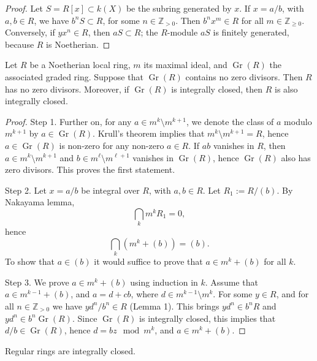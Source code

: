 \begin{proof}
Let $S=R[x]\subset k(X)$ be the subring
generated by $x$. If $x=a/b$, with
$a,b\in R$, we have $b^nS\subset R$, for
some $n\in\mathbb{Z}_{>0}$. Then
$b^nx^m\in R$ for all $m\in\mathbb{Z}_{\geq 0}$.
Conversely, if $yx^n\in R$, then
$aS\subset R$; the $R$-module $aS$ is
finitely generated, because $R$ is
Noetherian.
\end{proof}



\begin{proposition}
\label{proposition-regular-rings-integrally-closed}
Let $R$ be a Noetherian local ring, $m$
its maximal ideal, and $\operatorname{Gr}(R)$
the associated graded ring. Suppose that
$\operatorname{Gr}(R)$ contains no zero
divisors. Then $R$ has no zero divisors.
Moreover, if $\operatorname{Gr}(R)$ is
integrally closed, then $R$ is also
integrally closed.
\end{proposition}

\begin{proof}
Step 1. Further on, for any
$a\in m^k\setminus m^{k+1}$, we denote the
class of $a$ modulo $m^{k+1}$ by $a\in
\operatorname{Gr}(R)$. Krull's theorem
implies that $m^k\setminus m^{k+1}=R$,
hence $a\in\operatorname{Gr}(R)$ is
non-zero for any non-zero $a\in R$. If $ab$
vanishes in $R$, then
$a\in m^k\setminus m^{k+1}$ and
$b\in m^\ell\setminus m^{\ell+1}$ vanishes
in $\operatorname{Gr}(R)$, hence
$\operatorname{Gr}(R)$ also has zero
divisors. This proves the first statement.

Step 2. Let $x=a/b$ be integral over $R$,
with $a,b\in R$. Let $R_1:=R/(b)$.
By Nakayama lemma,
$$
\bigcap_k m^kR_1=0,
$$
hence
$$
\bigcap_k(m^k+(b))=(b).
$$
To show that $a\in(b)$ it would suffice to
prove that $a\in m^k+(b)$ for all $k$.

Step 3. We prove $a\in m^k+(b)$ using
induction in $k$. Assume that
$a\in m^{k-1}+(b)$, and $a=d+cb$, where
$d\in m^{k-1}\setminus m^k$.
For some $y\in R$, and for all
$n\in\mathbb{Z}_{>0}$ we have
$yd^n/b^n\in R$ (Lemma 1).
This brings $yd^n\in b^nR$ and
$yd^n\in b^n\operatorname{Gr}(R)$.
Since $\operatorname{Gr}(R)$ is integrally
closed, this implies that $d/b\in
\operatorname{Gr}(R)$, hence
$d=bz\mod m^k$, and $a\in m^k+(b)$.
\end{proof}

\begin{corollary}
\label{lemma-regular-rings-integrally-closed}
Regular rings are integrally closed.
\end{corollary}

